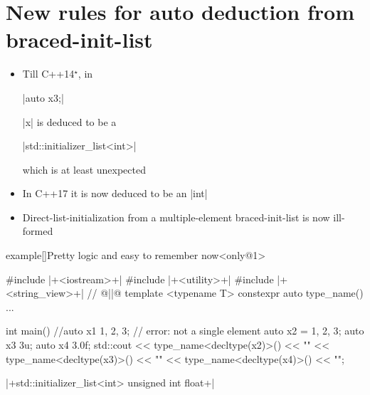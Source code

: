 \section{New rules for auto deduction from braced-init-list}
\begin{frame}[fragile]{\insertsectionhead}
    \begin{itemize}
        \item Till C++14$^\star$, in
              \begin{center}
                  \CPP|auto x{3};|
              \end{center}
              \CPP|x| is deduced to be a
              \begin{center}
                  \CPP|std::initializer_list<int>|
              \end{center}
              which is at least unexpected 
        \item In C++17 it is now deduced to be an \CPP|int|
        \item Direct-list-initialization from a multiple-element braced-init-list is now ill-formed
    \end{itemize}
    \PrepareURLsymbol[PB]
\end{frame}
\begin{frame}[fragile]{}
    \PrepareURLsymbol[red]
    \begin{varblock}{example}[\textwidth]{Pretty logic and easy to remember now}<only@1>
        \begin{Cpp}
            #include |+<iostream>+|
            #include |+<utility>+|
            #include |+<string_view>+| // @||@
            template <typename T> constexpr auto type_name() {...}

            int main(){
                //auto x1 {1, 2, 3}; // error: not a single element
                auto x2 = {1, 2, 3};
                auto x3 {3u};
                auto x4 {3.0f};
                std::cout << type_name<decltype(x2)>() << "\n"
                          << type_name<decltype(x3)>() << "\n"
                          << type_name<decltype(x4)>() << "\n";
            }
        \end{Cpp}
        \begin{Bash}[numbers=none]
            |+std::initializer_list<int>
            unsigned int
            float+|
        \end{Bash}
    \end{varblock}
\end{frame}

